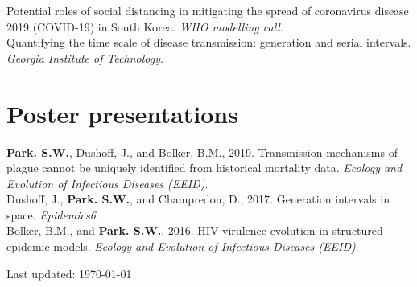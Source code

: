 \documentclass[11pt]{article} %
\begin{document}
 Potential roles of social distancing in mitigating the spread of coronavirus disease 2019 (COVID-19) in South Korea. \textit{WHO modelling call}.\\

 Quantifying the time scale of disease transmission: generation and serial intervals. \textit{Georgia Institute of Technology}.\\

\section*{Poster presentations}

 \textbf{Park. S.W.}, Dushoff, J., and Bolker, B.M., 2019. Transmission mechanisms of plague cannot be uniquely identified from historical mortality data. \textit{Ecology and Evolution of Infectious Diseases (EEID)}.\\

 Dushoff, J., \textbf{Park. S.W.}, and Champredon, D., 2017. Generation intervals in space. \textit{Epidemics6}.\\

 Bolker, B.M., and \textbf{Park. S.W.}, 2016. HIV virulence evolution in structured epidemic models. \textit{Ecology and Evolution of Infectious Diseases (EEID)}.\\



\vfill %


\begin{center}
	\scriptsize
	Last updated: \today
\end{center}

\end{document}
